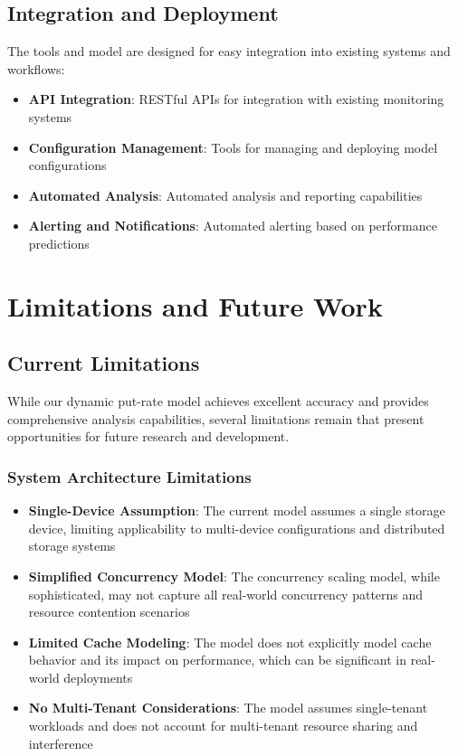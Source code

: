 \documentclass[11pt]{article}
\begin{document}
\subsection{Integration and Deployment}

The tools and model are designed for easy integration into existing systems and workflows:

\begin{itemize}
    \item \textbf{API Integration}: RESTful APIs for integration with existing monitoring systems
    \item \textbf{Configuration Management}: Tools for managing and deploying model configurations
    \item \textbf{Automated Analysis}: Automated analysis and reporting capabilities
    \item \textbf{Alerting and Notifications}: Automated alerting based on performance predictions
\end{itemize}

\section{Limitations and Future Work}

\subsection{Current Limitations}

While our dynamic put-rate model achieves excellent accuracy and provides comprehensive analysis capabilities, several limitations remain that present opportunities for future research and development.

\subsubsection{System Architecture Limitations}
\begin{itemize}
    \item \textbf{Single-Device Assumption}: The current model assumes a single storage device, limiting applicability to multi-device configurations and distributed storage systems
    \item \textbf{Simplified Concurrency Model}: The concurrency scaling model, while sophisticated, may not capture all real-world concurrency patterns and resource contention scenarios
    \item \textbf{Limited Cache Modeling}: The model does not explicitly model cache behavior and its impact on performance, which can be significant in real-world deployments
    \item \textbf{No Multi-Tenant Considerations}: The model assumes single-tenant workloads and does not account for multi-tenant resource sharing and interference
\end{itemize}
\end{document}
